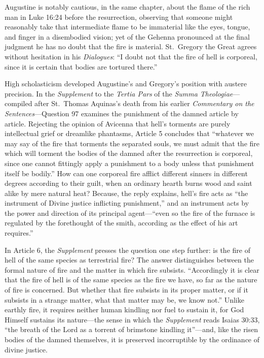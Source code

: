 Augustine is notably cautious, in the same chapter, about the flame of the rich man in Luke 16:24 before the resurrection, observing that someone might reasonably take that intermediate flame to be immaterial like the eyes, tongue, and finger in a disembodied vision; yet of the Gehenna pronounced at the final judgment he has no doubt that the fire is material. St.\ Gregory the Great agrees without hesitation in his \textit{Dialogues}: ``I doubt not that the fire of hell is corporeal, since it is certain that bodies are tortured there.''

High scholasticism developed Augustine's and Gregory's position with austere precision. In the \textit{Supplement} to the \textit{Tertia Pars} of the \textit{Summa Theologiae}---compiled after St.\ Thomas Aquinas's death from his earlier \textit{Commentary on the Sentences}---Question 97 examines the punishment of the damned article by article. Rejecting the opinion of Avicenna that hell's torments are purely intellectual grief or dreamlike phantasms, Article 5 concludes that ``whatever we may say of the fire that torments the separated souls, we must admit that the fire which will torment the bodies of the damned after the resurrection is corporeal, since one cannot fittingly apply a punishment to a body unless that punishment itself be bodily.'' How can one corporeal fire afflict different sinners in different degrees according to their guilt, when an ordinary hearth burns wood and saint alike by mere natural heat? Because, the reply explains, hell's fire acts as ``the instrument of Divine justice inflicting punishment,'' and an instrument acts by the power and direction of its principal agent---``even so the fire of the furnace is regulated by the forethought of the smith, according as the effect of his art requires.''

In Article 6, the \textit{Supplement} presses the question one step further: is the fire of hell of the same species as terrestrial fire? The answer distinguishes between the formal nature of fire and the matter in which fire subsists. ``Accordingly it is clear that the fire of hell is of the same species as the fire we have, so far as the nature of fire is concerned. But whether that fire subsists in its proper matter, or if it subsists in a strange matter, what that matter may be, we know not.'' Unlike earthly fire, it requires neither human kindling nor fuel to sustain it, for God Himself sustains its nature---the sense in which the \textit{Supplement} reads Isaias 30:33, ``the breath of the Lord as a torrent of brimstone kindling it''---and, like the risen bodies of the damned themselves, it is preserved incorruptible by the ordinance of divine justice.

